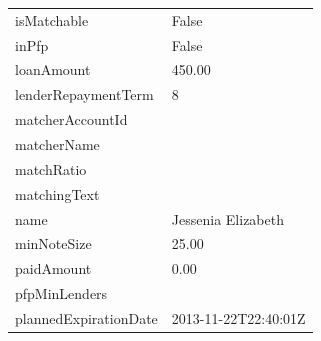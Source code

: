 \begin{longtable}{|p{}|p{}|}
	isMatchable                                     & False                                                                                                         \\
	inPfp                                           & False                                                                                                         \\
	loanAmount                                      & 450.00                                                                                                        \\
	lenderRepaymentTerm                             & 8                                                                                                             \\
	matcherAccountId                                &                                                                                                               \\
	matcherName                                     &                                                                                                               \\
	matchRatio                                      &                                                                                                               \\
	matchingText                                    &                                                                                                               \\
	name                                            & Jessenia Elizabeth                                                                                            \\
	minNoteSize                                     & 25.00                                                                                                         \\
	paidAmount                                      & 0.00                                                                                                          \\
	pfpMinLenders                                   &                                                                                                               \\
	plannedExpirationDate                           & 2013-11-22T22:40:01Z                                                                                          \\

\end{longtable}
